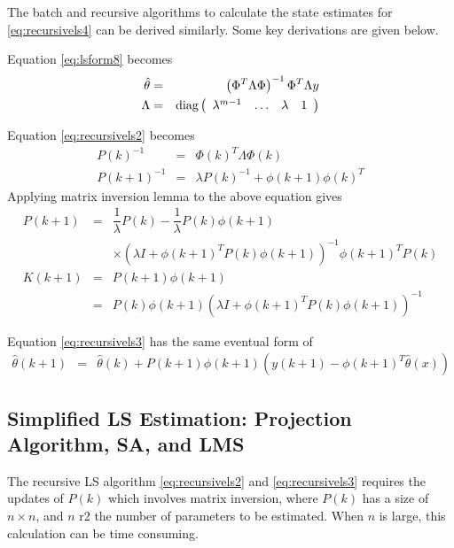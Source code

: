 The batch and recursive algorithms to calculate the state estimates for \eqref{eq:recursivels4} can be derived similarly. Some key derivations are given below.

Equation \eqref{eq:lsform8} becomes
\begin{eqnarray}
\hat{\theta} &=& \left(\Phi^T\Lambda\Phi\right)^{-1}\Phi^T\Lambda y \nonumber \\
\Lambda &=& \textup{diag}\left(\begin{array}{cccc}
                                 \lambda^{m-1} & \ldots & \lambda & 1
                               \end{array}\right) \nonumber
\end{eqnarray}

Equation \eqref{eq:recursivels2} becomes
\begin{eqnarray}
P(k)^{-1} &=& \Phi(k)^T\Lambda \Phi(k) \nonumber \\
P(k+1)^{-1} &=& \lambda P(k)^{-1} + \phi(k+1)\phi(k)^T \nonumber
\end{eqnarray}
Applying matrix inversion lemma to the above equation gives
\begin{eqnarray}
P(k+1) &=& \dfrac{1}{\lambda}P(k) - \dfrac{1}{\lambda}P(k)\phi(k+1) \nonumber \\ && \times \left(\lambda I + \phi(k+1)^TP(k)\phi(k+1)\right)^{-1}\phi(k+1)^TP(k) \nonumber \\
K(k+1) &=& P(k+1) \phi(k+1) \nonumber \\
&=&  P(k)\phi(k+1)\left(\lambda I + \phi(k+1)^TP(k)\phi(k+1)\right)^{-1} \nonumber
\end{eqnarray}

Equation \eqref{eq:recursivels3} has the same eventual form of
\begin{eqnarray}
  \hat{\theta}(k+1) &=& \hat{\theta}(k) + P(k+1)\phi(k+1)\left(y(k+1) - \phi(k+1)^T\hat{\theta}(x)\right) \nonumber
\end{eqnarray}

\subsection{Simplified LS Estimation: Projection Algorithm, SA, and LMS}

The recursive LS algorithm \eqref{eq:recursivels2} and \eqref{eq:recursivels3} requires the updates of $P(k)$ which involves matrix inversion, where $P(k)$ has a size of $n\times n$, and $n$ r2 the number of parameters to be estimated. When $n$ is large, this calculation can be time consuming.

